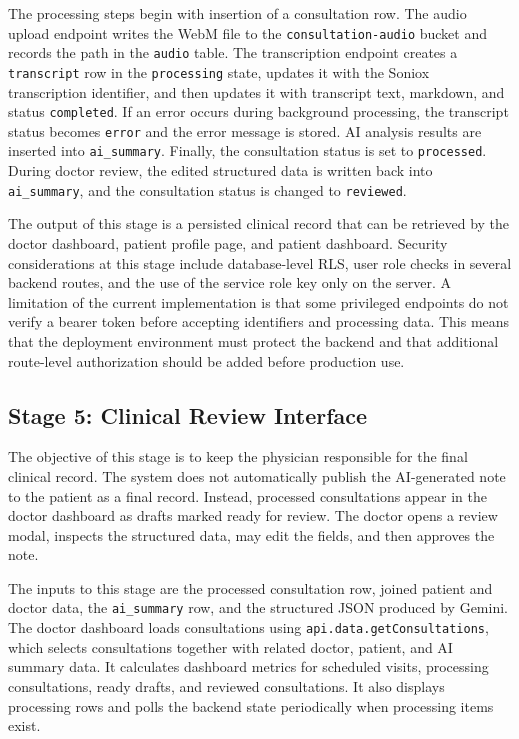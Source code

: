 The processing steps begin with insertion of a consultation row. The audio upload endpoint writes the WebM file to the \texttt{consultation-audio} bucket and records the path in the \texttt{audio} table. The transcription endpoint creates a \texttt{transcript} row in the \texttt{processing} state, updates it with the Soniox transcription identifier, and then updates it with transcript text, markdown, and status \texttt{completed}. If an error occurs during background processing, the transcript status becomes \texttt{error} and the error message is stored. AI analysis results are inserted into \texttt{ai\_summary}. Finally, the consultation status is set to \texttt{processed}. During doctor review, the edited structured data is written back into \texttt{ai\_summary}, and the consultation status is changed to \texttt{reviewed}.

The output of this stage is a persisted clinical record that can be retrieved by the doctor dashboard, patient profile page, and patient dashboard. Security considerations at this stage include database-level RLS, user role checks in several backend routes, and the use of the service role key only on the server. A limitation of the current implementation is that some privileged endpoints do not verify a bearer token before accepting identifiers and processing data. This means that the deployment environment must protect the backend and that additional route-level authorization should be added before production use.

\subsection{Stage 5: Clinical Review Interface}
\label{subsec:stage-review-interface}

The objective of this stage is to keep the physician responsible for the final clinical record. The system does not automatically publish the AI-generated note to the patient as a final record. Instead, processed consultations appear in the doctor dashboard as drafts marked ready for review. The doctor opens a review modal, inspects the structured data, may edit the fields, and then approves the note.

The inputs to this stage are the processed consultation row, joined patient and doctor data, the \texttt{ai\_summary} row, and the structured JSON produced by Gemini. The doctor dashboard loads consultations using \texttt{api.data.getConsultations}, which selects consultations together with related doctor, patient, and AI summary data. It calculates dashboard metrics for scheduled visits, processing consultations, ready drafts, and reviewed consultations. It also displays processing rows and polls the backend state periodically when processing items exist.

